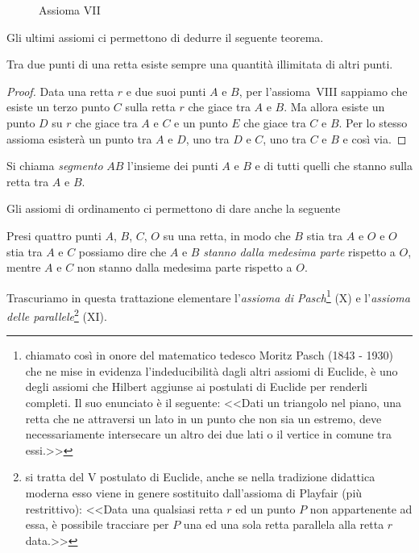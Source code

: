 \begin{inaccessibleblock}
 \begin{figure}[htb]
 \centering
 
 \caption{Assioma VII}\label{fig:1.6}
\end{figure}
\end{inaccessibleblock}

Gli ultimi assiomi ci permettono di dedurre il seguente teorema.
\begin{teorema}
Tra due punti di una retta esiste sempre una quantità illimitata di 
altri punti.
\end{teorema}
\begin{proof}
Data una retta $r$ e due suoi punti $A$ e $B$, per l'assioma~VIII 
sappiamo che esiste un terzo punto $C$ sulla retta $r$ che giace tra 
$A$ e $B$. Ma allora esiste un punto $D$ su $r$ che giace tra $A$ e 
$C$ e un punto $E$ che giace tra $C$ e $B$. Per lo stesso assioma 
esisterà un punto tra $A$ e $D$, uno tra $D$ e $C$, uno tra $C$ e $B$ 
e così via.
\end{proof}
\begin{center}

\end{center}
\begin{definizione}
Si chiama \emph{segmento} $AB$ l'insieme dei punti $A$ e $B$ e di 
tutti quelli che stanno sulla retta tra $A$ e $B$.
\end{definizione}
Gli assiomi di ordinamento ci permettono di dare anche la seguente

\begin{definizione}
Presi quattro punti $A$, $B$, $C$, $O$ su una retta, in modo che $B$ 
stia tra $A$ e $O$ e $O$ stia tra $A$ e $C$ possiamo dire che $A$ e 
$B$ \emph{stanno dalla medesima parte} rispetto a $O$, mentre $A$ e 
$C$ non stanno dalla medesima parte rispetto a $O$.
\end{definizione}
\begin{center}

\end{center}

\osservazione Trascuriamo in questa trattazione elementare 
l'\emph{assioma di Pasch}\footnote{chiamato così in onore del 
matematico tedesco Moritz Pasch (1843 - 1930) che ne mise in evidenza 
l'indeducibilità dagli altri assiomi di Euclide, è uno degli assiomi 
che Hilbert aggiunse ai postulati di Euclide per renderli completi. 
Il suo enunciato è il seguente: <<Dati un triangolo nel piano, una 
retta che ne attraversi un lato in un punto che non sia un estremo, 
deve necessariamente intersecare un altro dei due lati o il vertice 
in comune tra essi.>>} (X) e l'\emph{assioma delle 
parallele}\footnote{si tratta del V postulato di Euclide, anche se 
nella tradizione didattica moderna esso viene in genere sostituito 
dall'assioma di Playfair (più restrittivo): <<Data una qualsiasi 
retta $r$ ed un punto $P$ non appartenente ad essa, è possibile 
tracciare per $P$ una ed una sola retta parallela alla retta $r$ 
data.>>} (XI).

